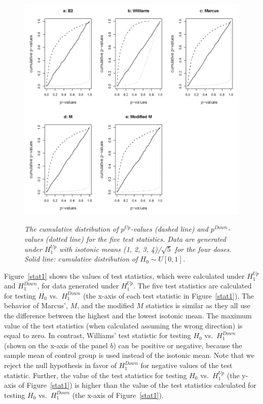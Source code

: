 \documentclass[10pt]{article}
\begin{document}
\begin{figure}[!h]
\centering
{\includegraphics[width=1\textwidth]{pupdn1b.png}}
\caption{\em{The cumulative distribution of $p^{Up}$-values (dashed
line) and $p^{Down}$-values (dotted line) for the five test
statistics. Data are generated under $H_1^{Up}$ with isotonic means
(1, 2, 3, 4)/$\sqrt{5}$ for the four doses. Solid line: cumulative
distribution of $H_0\sim U[0,1]$.}} \label{pupdn1}
\end{figure}


Figure~\ref{stat1} shows the values of test statistics, which were
calculated under $H^{Up}_1$ and $H^{Down}_1$, for data generated
under $H^{Up}_1$. The five test statistics are calculated for
testing $H_0$ vs.\ $H^{Down}_1$ (the x-axis of each test statistic
in Figure~\ref{stat1}). The behavior of Marcus', $M$, and the
modified $M$ statistics is similar as they all use the difference
between the highest and the lowest isotonic mean.
The maximum value of the test statistics (when calculated assuming
the wrong direction) is equal to zero. In contrast, Williams' test
statistic for testing $H_0$ vs.\ $H^{Down}_1$ (shown on the x-axis
of the panel $b$) can be positive or negative, because the sample
mean of control group is used instead of the isotonic mean. Note
that we reject the null hypothesis in favor of $H^{Down}_1$ for
negative values of the test statistic. Further, the value of the
test statistics for testing $H_0$ vs.\ $H^{Up}_1$ (the y-axis of
Figure~\ref{stat1}) is higher than the value of the test statistics
calculated for testing $H_0$ vs.\ $H^{Down}_1$ (the x-axis of
Figure~\ref{stat1}).
\end{document}
